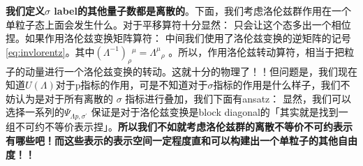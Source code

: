 \textbf{我们定义$ \sigma $ label的其他量子数都是离散的}。下面，我们考虑洛伦兹群作用在一个单粒子态上面会发生什么。对于平移算符十分显然：
只会让这个态多出一个相位捏。如果作用洛伦兹变换矩阵算符：
中间我们使用了洛伦兹变换的逆矩阵的记号\cref{eq:invlorentz}。其中$ (\Lambda^{-1})_{\rho}{}^{\mu} =  \Lambda^{\mu}{}_{\rho}$ 。所以，作用洛伦兹转动算符，相当于把粒子的动量进行一个洛伦兹变换的转动。这就十分的物理了！！但问题是，我们现在知道$ U(\Lambda) $对于p指标的作用，可是不知道对于$ \sigma $指标的作用是什么样子，我们不妨认为是对于所有离散的 $ \sigma $ 指标进行叠加，我们下面有ansatz：
显然，我们可以选择一系列的$ \Psi_{\Lambda p,\sigma^{\prime}} $ 保证是对于洛伦兹变换是block diagonal的「其实就是找到一组不可约不等价表示捏」。\textbf{所以我们不如就考虑洛伦兹群的离散不等价不可约表示有哪些吧！而这些表示的表示空间一定程度直和可以构建出一个单粒子的其他自由度！！}

